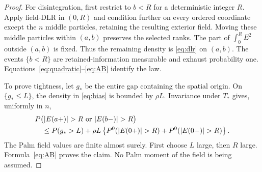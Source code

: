 \documentclass[11pt,reqno]{amsart}
\theoremstyle{definition}
\theoremstyle{remark}
\newcommand{\1}{\mathbf 1}
\numberwithin{equation}{section}
\begin{document}
\begin{proof}
For disintegration, first restrict to $b<R$ for a deterministic integer
$R$. Apply field-DLR in $(0,R)$ and condition further on every ordered
coordinate except the $n$ middle particles, retaining the resulting
exterior field. Moving these middle particles within $(a,b)$ preserves
the selected ranks. The part of $\int_0^R E^2$ outside $(a,b)$ is fixed.
Thus the remaining density is \eqref{eq:dlr} on $(a,b)$. The events
$\{b<R\}$ are retained-information measurable and exhaust probability
one. Equations~\eqref{eq:quadratic}--\eqref{eq:AB} identify the law.

To prove tightness, let $g_*$ be the entire gap containing the spatial
origin. On $\{g_*\le L\}$, the density in \eqref{eq:bias} is bounded
by $\rho L$. Invariance under $T_*$ gives, uniformly in $n$,
\begin{align*}
 &P\big(|E(a+)|>R\ \hbox{or}\ |E(b-)|>R\big)\\
 &\quad\le P(g_*>L)+\rho L\left\{
 P^0(|E(0+)|>R)+P^0(|E(0-)|>R)\right\}.
\end{align*}
The Palm field values are finite almost surely. First choose $L$ large,
then $R$ large. Formula~\eqref{eq:AB} proves the claim. No Palm moment
of the field is being assumed.
\end{proof}
\end{document}
